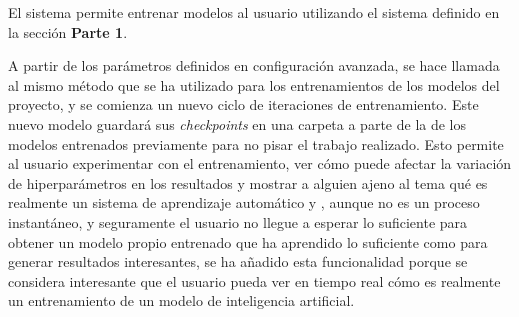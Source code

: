 El sistema permite entrenar modelos al usuario utilizando el sistema definido en la sección \textbf{Parte 1}.

A partir de los parámetros definidos en configuración avanzada, se hace llamada al mismo método que se ha utilizado para los entrenamientos de los modelos del proyecto, y se comienza un nuevo ciclo de iteraciones de entrenamiento. Este nuevo modelo guardará sus \textit{checkpoints} en una carpeta a parte de la de los modelos entrenados previamente para no pisar el trabajo realizado.
Esto permite al usuario experimentar con el entrenamiento, ver cómo puede afectar la variación de hiperparámetros en los resultados y mostrar a alguien ajeno al tema qué es realmente un sistema de aprendizaje automático y , aunque no es un proceso instantáneo, y seguramente el usuario no llegue a esperar lo suficiente para obtener un modelo propio entrenado que ha aprendido lo suficiente como para generar resultados interesantes, se ha añadido esta funcionalidad porque se 
considera interesante que el usuario pueda ver en tiempo real cómo es realmente un entrenamiento de un modelo de inteligencia artificial.